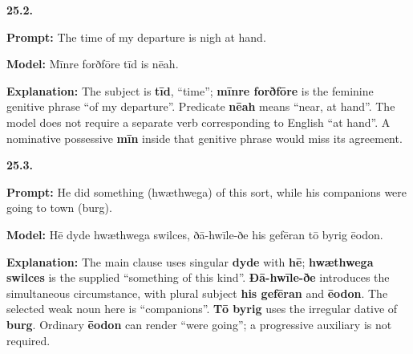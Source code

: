 \par\begin{minipage}{\linewidth}\raggedright
\textbf{25.2.}

\textbf{Prompt:} The time of my departure is nigh at hand.

\textbf{Model:} Mīnre forðfōre tīd is nēah.

\textbf{Explanation:} The subject is \textbf{tīd}, “time”; \textbf{mīnre forðfōre} is the feminine genitive phrase “of my departure”. Predicate \textbf{nēah} means “near, at hand”. The model does not require a separate verb corresponding to English “at hand”. A nominative possessive \textbf{mīn} inside that genitive phrase would miss its agreement.

\end{minipage}\par\addvspace{4pt}

\par\begin{minipage}{\linewidth}\raggedright
\textbf{25.3.}

\textbf{Prompt:} He did something (hwæthwega) of this sort, while his companions were going to town (burg).

\textbf{Model:} Hē dyde hwæthwega swilces, ðā-hwīle-ðe his gefēran tō byrig ēodon.

\textbf{Explanation:} The main clause uses singular \textbf{dyde} with \textbf{hē}; \textbf{hwæthwega swilces} is the supplied “something of this kind”. \textbf{Ðā-hwīle-ðe} introduces the simultaneous circumstance, with plural subject \textbf{his gefēran} and \textbf{ēodon}. The selected weak noun here is “companions”. \textbf{Tō byrig} uses the irregular dative of \textbf{burg}. Ordinary \textbf{ēodon} can render “were going”; a progressive auxiliary is not required.

\end{minipage}\par\addvspace{4pt}

